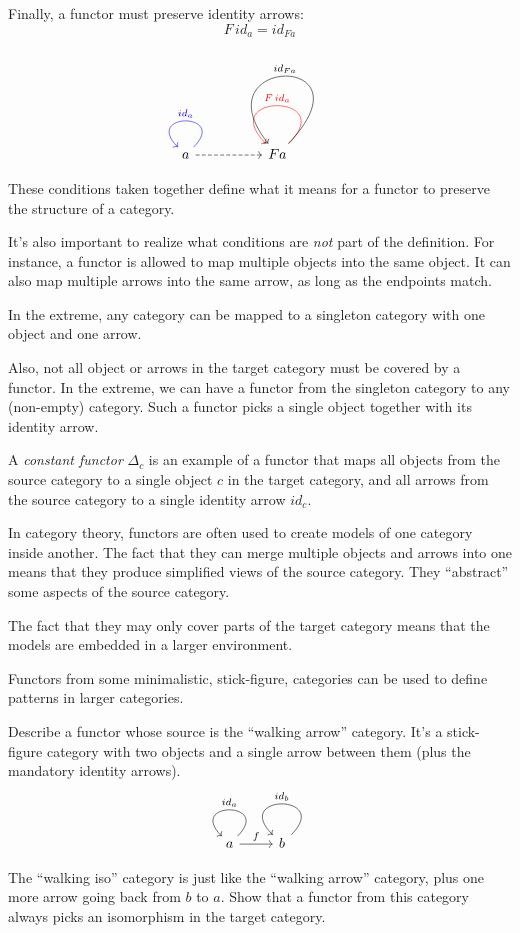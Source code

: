 \documentclass[DaoFP]{subfiles}
\begin{document}
Finally, a functor must preserve identity arrows:
\[ F\, id_a = id_{F a} \]

\[
 \begin{tikzcd}
 a 
  \arrow[loop, blue,  "id_a"']
\arrow[rr, dashed]
 && F a
  \arrow[loop, red, "F \, id_{a}"']
  \arrow[loop, controls={+(2.5, 2.6) and +(-2, 2.5)}, "id_{F a}"']
  \end{tikzcd}
\]

These conditions taken together define what it means for a functor to preserve the structure of a category.

It's also important to realize what conditions are \emph{not} part of the definition. For instance, a functor is allowed to map multiple objects into the same object. It can also map multiple arrows into the same arrow, as long as the endpoints match. 

In the extreme, any category can be mapped to a singleton category with one object and one arrow.

Also, not all object or arrows in the target category must be covered by a functor. In the extreme, we can have a functor from the singleton category to any (non-empty) category. Such a functor picks a single object together with its identity arrow.

A \emph{constant functor} $\Delta_c$ is an example of a functor that maps all objects from the source category to a single object $c$ in the target category, and all arrows from the source category to a single identity arrow $id_c$.

In category theory, functors are often used to create models of one category inside another. The fact that they can merge multiple objects and arrows into one means that they produce simplified views of the source category. They ``abstract'' some aspects of the source category.

The fact that they may only cover parts of the target category means that the models are embedded in a larger environment.

Functors from some minimalistic, stick-figure, categories can be used to define patterns in larger categories.

\begin{exercise}
Describe a functor whose source is the ``walking arrow'' category. It's a stick-figure category with two objects and a single arrow between them (plus the mandatory identity arrows).
\[
 \begin{tikzcd}
 a 
  \arrow[loop,  "id_{a}"']
\arrow[r, "f"]
 & b
  \arrow[loop, "id_{b}"']
  \end{tikzcd}
\]
\end{exercise}
\begin{exercise}
The ``walking iso'' category is just like the ``walking arrow'' category, plus one more arrow going back from $b$ to $a$. Show that a functor from this category always picks an isomorphism in the target category. 
\end{exercise}
\end{document}
